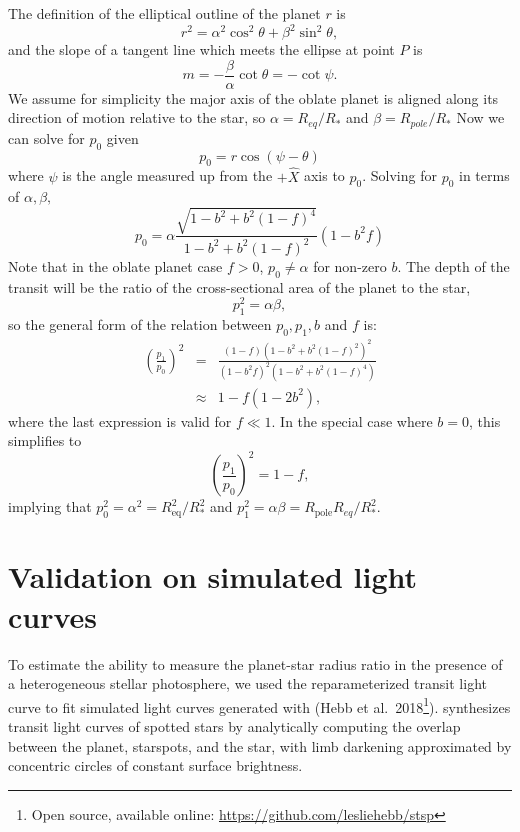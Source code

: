 The definition of the elliptical outline of the planet $r$ is
\begin{equation}
r^2 = \alpha^2 \cos^2 \theta + \beta^2 \sin^2 \theta,
\end{equation}
and the slope of a tangent line which meets the ellipse at point $P$ is
\begin{equation}
m = -\frac{\beta}{\alpha} \cot{\theta} = -\cot{\psi}.
\end{equation}
We assume for simplicity the major axis of the oblate planet is
aligned along its direction of motion relative to the star, so $\alpha = R_{eq}/R_*$
and $\beta = R_{pole}/R_*$
Now we can solve for $p_0$ given 
\begin{equation}
p_0 = r \cos{(\psi-\theta)}
\end{equation}
where $\psi$ is the angle measured up from the $+\hat{X}$ axis to $p_0$. Solving for $p_0$ in terms of $\alpha, \beta,$
\begin{equation}
p_0 = \alpha \frac{\sqrt{1-b^2+b^2(1-f)^4}}{1-b^2+b^2(1-f)^2} (1-b^2f)
\end{equation}
Note that in the oblate planet case $f > 0$, $p_0 \neq \alpha$ for non-zero $b$. The depth of the transit will be the ratio of the cross-sectional area of the planet to the star, 
\begin{equation}
p_1^2 = \alpha \beta,
\end{equation}
so the general form of the relation between $p_0,p_1,b$ and $f$ is:
\begin{eqnarray}
\left(\frac{p_1}{p_0}\right)^2 &=&  \frac{(1-f) (1-b^2+b^2(1-f)^2)^2}{(1-b^2f)^2(1-b^2+b^2(1-f)^4)}\\
&\approx& 1-f (1-2b^2),
\end{eqnarray}
where the last expression is valid for $f \ll 1$.
In the special case where $b=0$, this simplifies to 
\begin{equation}
\left(\frac{p_1}{p_0}\right)^2 = 1-f,
\end{equation}
implying that $p_0^2 = \alpha^2 = R_\mathrm{eq}^2/R_*^2$ and $p_1^2 = \alpha\beta = R_\mathrm{pole}R_{eq}/R_*^2$. 

\section{Validation on simulated light curves} \label{sec:valid}

To estimate the ability to measure the planet-star radius ratio in the presence of a heterogeneous stellar photosphere, we used the reparameterized transit light curve to fit simulated light curves generated with \stsp (Hebb et al.~2018\footnote{Open source, available online: \url{https://github.com/lesliehebb/stsp}}). \stsp synthesizes transit light curves of spotted stars by analytically computing the overlap between the planet, starspots, and the star, with limb darkening approximated by concentric circles of constant surface brightness. 

